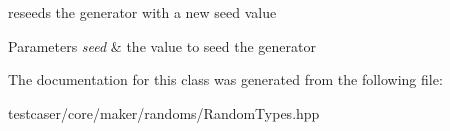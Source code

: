 reseeds the generator with a new seed value 


\begin{DoxyParams}{Parameters}
{\em seed} & the value to seed the generator \\
\hline
\end{DoxyParams}


The documentation for this class was generated from the following file\+:\begin{DoxyCompactItemize}
\item 
testcaser/core/maker/randoms/Random\+Types.\+hpp\end{DoxyCompactItemize}

